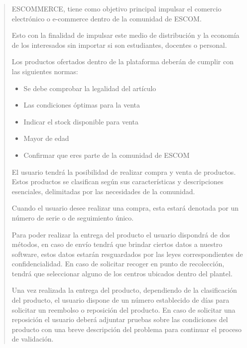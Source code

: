 \documentclass[14pt]{article}
\begin{document}
        \begin{quote}
            ESCOMMERCE, tiene como objetivo principal impulsar el comercio electrónico o e-commerce dentro de la comunidad de ESCOM. 
            
            \vspace{0.5cm}Esto con la finalidad de impulsar este medio de distribución y la economía de los interesados sin importar si son estudiantes, docentes o personal.
    
            \vspace{0.5cm}Los productos ofertados dentro de la plataforma deberán de cumplir con las siguientes normas:
            
                \begin{itemize}
                    \item Se debe comprobar la legalidad del artículo
                    \item Las condiciones óptimas para la venta
                    \item Indicar el stock disponible para venta
                    \item Mayor de edad
                    \item Confirmar que eres parte de la comunidad de ESCOM
                \end{itemize}
    
            \vspace{0.5cm}El usuario tendrá la posibilidad de realizar compra y venta de productos. Estos productos se clasifican según sus características y descripciones esenciales, delimitadas por las necesidades de la comunidad.
    
            \vspace{0.5cm}Cuando el usuario desee realizar una compra, esta estará denotada por un número de serie o de seguimiento único.
    
            \vspace{0.5cm}Para poder realizar la entrega del producto el usuario dispondrá de dos métodos, en caso de envío tendrá que brindar ciertos datos a nuestro software, estos datos estarán resguardados por las leyes correspondientes de confidencialidad. En caso de solicitar recoger en punto de recolección, tendrá que seleccionar alguno de los centros ubicados dentro del plantel.
    
            \vspace{0.5cm}Una vez realizada la entrega del producto, dependiendo de la clasificación del producto, el usuario dispone de un número establecido de días para solicitar un reembolso o reposición del producto. En caso de solicitar una reposición el usuario deberá adjuntar pruebas sobre las condiciones del producto con una breve descripción del problema para continuar el proceso de validación.
    

\end{quote}
\end{document}
